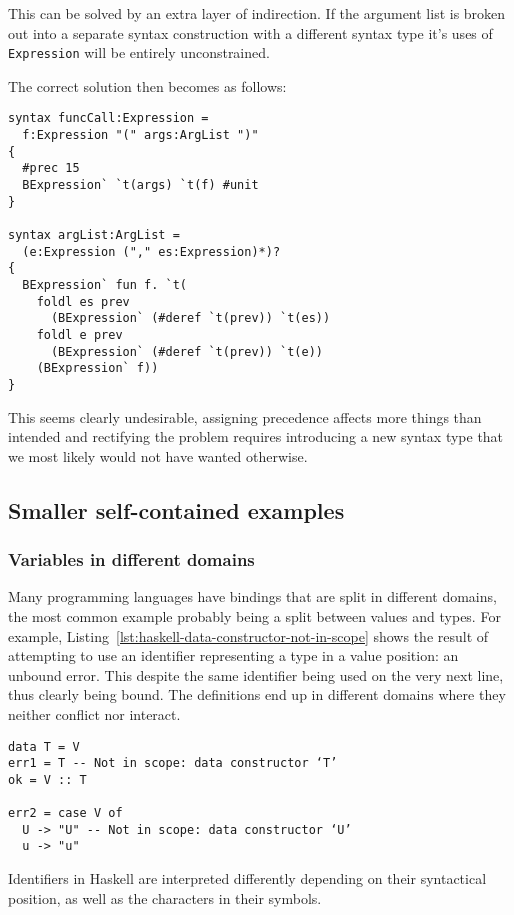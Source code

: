 \documentclass{kththesis}
\begin{document}
This can be solved by an extra layer of indirection. If the argument list is broken out into a separate syntax construction with a different syntax type it's uses of \texttt{Expression} will be entirely unconstrained.

The correct solution then becomes as follows:

\begin{verbatim}
syntax funcCall:Expression =
  f:Expression "(" args:ArgList ")"
{
  #prec 15
  BExpression` `t(args) `t(f) #unit
}

syntax argList:ArgList =
  (e:Expression ("," es:Expression)*)?
{
  BExpression` fun f. `t(
    foldl es prev
      (BExpression` (#deref `t(prev)) `t(es))
    foldl e prev
      (BExpression` (#deref `t(prev)) `t(e))
    (BExpression` f))
}
\end{verbatim}

This seems clearly undesirable, assigning precedence affects more things than intended and rectifying the problem requires introducing a new syntax type that we most likely would not have wanted otherwise.

\subsection{Smaller self-contained examples}

\subsubsection{Variables in different domains}


Many programming languages have bindings that are split in different domains, the most common example probably being a split between values and types. For example, Listing~\ref{lst:haskell-data-constructor-not-in-scope} shows the result of attempting to use an identifier representing a type in a value position: an unbound error. This despite the same identifier being used on the very next line, thus clearly being bound. The definitions end up in different domains where they neither conflict nor interact.

\begin{listing}[h]
\begin{verbatim}
data T = V
err1 = T -- Not in scope: data constructor ‘T’
ok = V :: T

err2 = case V of
  U -> "U" -- Not in scope: data constructor ‘U’
  u -> "u"
\end{verbatim}
\caption{Identifiers in Haskell are interpreted differently depending on their syntactical position, as well as the characters in their symbols.}
\label{lst:haskell-data-constructor-not-in-scope}
\end{listing}
\end{document}
